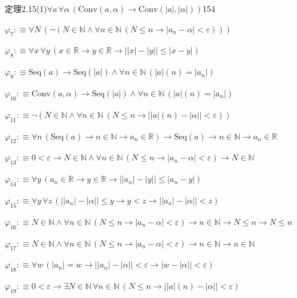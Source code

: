 \begin{fullproof}{定理2.15(1)}{$\forall a\,\forall \alpha\,(\mathrm{Conv}(a,\alpha) \to \mathrm{Conv}(\lvert a \rvert,\lvert \alpha \rvert))$}{154}
\begin{abbrevlist}
\item $\varphi_{7} :\equiv \forall N\,(\neg (N \in \mathbb{N} \land \forall n \in \mathbb{N}\,(N \leq n \to \lvert a_{n} - \alpha \rvert < \varepsilon)))$
\item $\varphi_{8} :\equiv \forall x\,\forall y\,(x \in \mathbb{R} \to y \in \mathbb{R} \to \lvert \lvert x \rvert - \lvert y \rvert \rvert \leq \lvert x - y \rvert)$
\item $\varphi_{9} :\equiv \mathrm{Seq}(a) \to \mathrm{Seq}(\lvert a \rvert) \land \forall n \in \mathbb{N}\,(\lvert a \rvert(n) = \lvert a_{n} \rvert)$
\item $\varphi_{10} :\equiv \mathrm{Conv}(a,\alpha) \to \mathrm{Seq}(\lvert a \rvert) \land \forall n \in \mathbb{N}\,(\lvert a \rvert(n) = \lvert a_{n} \rvert)$
\item $\varphi_{11} :\equiv \neg (N \in \mathbb{N} \land \forall n \in \mathbb{N}\,(N \leq n \to \lvert \lvert a \rvert(n) - \lvert \alpha \rvert \rvert < \varepsilon))$
\item $\varphi_{12} :\equiv \forall n\,(\mathrm{Seq}(a) \to n \in \mathbb{N} \to a_{n} \in \mathbb{R}) \to \mathrm{Seq}(a) \to n \in \mathbb{N} \to a_{n} \in \mathbb{R}$
\item $\varphi_{13} :\equiv 0 < \varepsilon \to N \in \mathbb{N} \land \forall n \in \mathbb{N}\,(N \leq n \to \lvert a_{n} - \alpha \rvert < \varepsilon) \to N \in \mathbb{N}$
\item $\varphi_{14} :\equiv \forall y\,(a_{n} \in \mathbb{R} \to y \in \mathbb{R} \to \lvert \lvert a_{n} \rvert - \lvert y \rvert \rvert \leq \lvert a_{n} - y \rvert)$
\item $\varphi_{15} :\equiv \forall y\,\forall z\,(\lvert \lvert a_{n} \rvert - \lvert \alpha \rvert \rvert \leq y \to y < z \to \lvert \lvert a_{n} \rvert - \lvert \alpha \rvert \rvert < z)$
\item $\varphi_{16} :\equiv N \in \mathbb{N} \land \forall n \in \mathbb{N}\,(N \leq n \to \lvert a_{n} - \alpha \rvert < \varepsilon) \to n \in \mathbb{N} \to N \leq n \to N \leq n$
\item $\varphi_{17} :\equiv N \in \mathbb{N} \land \forall n \in \mathbb{N}\,(N \leq n \to \lvert a_{n} - \alpha \rvert < \varepsilon) \to n \in \mathbb{N} \to n \in \mathbb{N}$
\item $\varphi_{18} :\equiv \forall w\,(\lvert a_{n} \rvert = w \to \lvert \lvert a_{n} \rvert - \lvert \alpha \rvert \rvert < \varepsilon \to \lvert w - \lvert \alpha \rvert \rvert < \varepsilon)$
\item $\varphi_{19} :\equiv 0 < \varepsilon \to \exists N \in \mathbb{N}\,\forall n \in \mathbb{N}\,(N \leq n \to \lvert \lvert a \rvert(n) - \lvert \alpha \rvert \rvert < \varepsilon)$

\end{abbrevlist}
\end{fullproof}
